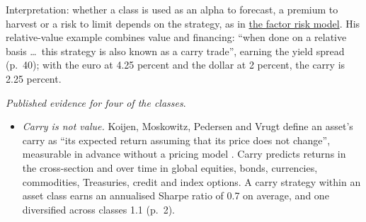 \begin{qfdefinition}
 Interpretation: whether a class is used as an alpha to forecast, a premium to harvest or a risk to limit depends on the strategy, as in \hyperref[mod:factor-risk-model]{the factor risk model}. His relative-value example combines value and financing: ``when done on a relative basis \dots\ this strategy is also known as a carry trade'', earning the yield spread (p.~40); with the euro at 4.25 percent and the dollar at 2 percent, the carry is 2.25 percent.

\emph{Published evidence for four of the classes}.
\begin{itemize}
\item \emph{Carry is not value.} Koijen, Moskowitz, Pedersen and Vrugt define an asset's carry as ``its expected return assuming that its price does not change'', measurable in advance without a pricing model \citep[NBER WP 19325, August 2013, abstract and sec.~I, PDF pp.~2--3]{alpha-carry}. Carry predicts returns in the cross-section and over time in global equities, bonds, currencies, commodities, Treasuries, credit and index options. A carry strategy within an asset class earns an annualised Sharpe ratio of 0.7 on average, and one diversified across classes 1.1 (p.~2).


\end{itemize}
\end{qfdefinition}
